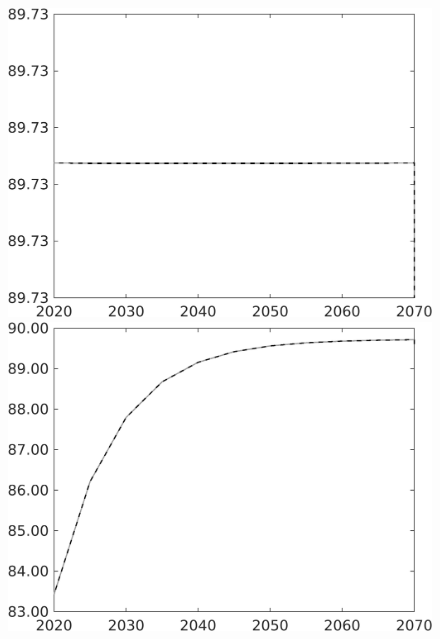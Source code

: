 \begin{figure}[h!!]
\begin{minipage}[]{0.32\textwidth}
	\end{minipage}	
	\begin{minipage}[]{0.32\textwidth}
		\includegraphics[width=1\textwidth]{../../codding_model/own_basedOnFried/optimalPol_010922_revision/figures/all_13Sept22/CompTaul_Equlab_LFBAU_Reg0_gAf_spillover0_nsk1_xgr1_knspil1_sep1_countec0_GovRev1_etaa0.79_lgd0.png}
	\end{minipage}	
	\begin{minipage}[]{0.32\textwidth}
		\includegraphics[width=1\textwidth]{../../codding_model/own_basedOnFried/optimalPol_010922_revision/figures/all_13Sept22/CompTaul_Equlab_LFBAU_Reg0_gAagg_spillover0_nsk1_xgr1_knspil1_sep1_countec0_GovRev1_etaa0.79_lgd0.png}

\end{minipage}
\end{figure}
